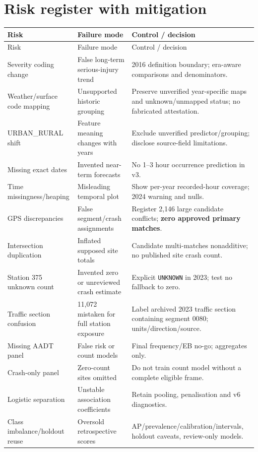 \documentclass[11pt,a4paper,openany]{report}
\newcommand{\pathcode}[1]{\nolinkurl{#1}}
\begin{document}
\section{Risk register with mitigation}
\small
\begin{longtable}{@{}L{33mm}L{50mm}L{59mm}@{}}\toprule Risk & Failure mode & Control / decision\\\midrule\endfirsthead
\toprule Risk & Failure mode & Control / decision\\\midrule\endhead
Severity coding change & False long-term serious-injury trend & 2016 definition boundary; era-aware comparisons and denominators.\\
Weather/surface code mapping & Unsupported historic grouping & Preserve unverified year-specific maps and unknown/unmapped status; no fabricated attestation.\\
URBAN\_RURAL shift & Feature meaning changes with years & Exclude unverified predictor/grouping; disclose source-field limitations.\\
Missing exact dates & Invented near-term forecasts & No 1--3 hour occurrence prediction in v3.\\
Time missingness/heaping & Misleading temporal plot & Show per-year recorded-hour coverage; 2024 warning and nulls.\\
GPS discrepancies & False segment/crash assignments & Register 2,146 large candidate conflicts; \textbf{zero approved primary matches}.\\
Intersection duplication & Inflated supposed site totals & Candidate multi-matches nonadditive; no published site crash count.\\
Station 375 unknown count & Invented zero or unreviewed crash estimate & Explicit \pathcode{UNKNOWN} in 2023; test no fallback to zero.\\
Traffic section confusion & 11,072 mistaken for full station exposure & Label archived 2023 traffic section containing segment 0080; units/direction/source.\\
Missing AADT panel & False risk or count models & Final frequency/EB no-go; aggregates only.\\
Crash-only panel & Zero-count sites omitted & Do not train count model without a complete eligible frame.\\
Logistic separation & Unstable association coefficients & Retain pooling, penalisation and v6 diagnostics.\\
Class imbalance/holdout reuse & Oversold retrospective scores & AP/prevalence/calibration/intervals, holdout caveats, review-only models.\\

\end{longtable}
\end{document}

